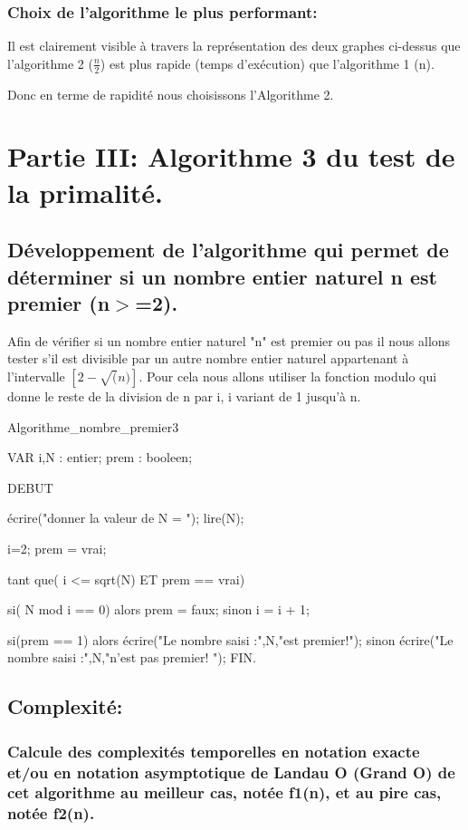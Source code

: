 \documentclass[12pt]{article}
\begin{document}
\subsubsection{Choix de l'algorithme le plus performant:}
Il est clairement visible à travers la représentation des deux graphes ci-dessus que l'algorithme 2 ($\frac{n}{2}$) est plus rapide (temps d'exécution) que l'algorithme 1 (n).

Donc en terme de rapidité nous choisissons l'Algorithme 2.


\section{Partie III: Algorithme 3 du test de la primalité.}

\subsection{Développement de l'algorithme qui permet de déterminer  si un nombre entier naturel n est premier (n$>$=2). }
Afin de vérifier si un nombre entier naturel "n" est premier ou pas il nous allons tester s'il est divisible par un autre nombre entier naturel appartenant à l'intervalle $[2 - \sqrt(n)]$.
Pour cela nous allons utiliser la fonction modulo qui donne le reste de la division de n par i, i variant de 1 jusqu'à n.


\begin{sql}

 Algorithme_nombre_premier3

 VAR
 i,N : entier;
 prem : booleen;
 
 DEBUT
 
	écrire("donner la valeur de N = ");
	lire(N);

	i=2;
	prem = vrai;

	tant que( i <= sqrt(N) ET prem == vrai){

		si( N mod i == 0)
			alors 
				prem = faux;				
			sinon
				i = i + 1;
	}

	si(prem == 1)
    	alors
        	écrire("Le nombre saisi :",N,"est premier!");
    	sinon
        	écrire("Le nombre saisi :",N,"n'est pas premier! ");
 FIN. 
 
\end{sql}

\subsection{Complexité:}

\subsubsection{Calcule des complexités temporelles en notation exacte et/ou en notation asymptotique de Landau O (Grand O) de  cet  algorithme au meilleur cas, notée f1(n), et au pire cas, notée f2(n). }
\end{document}
